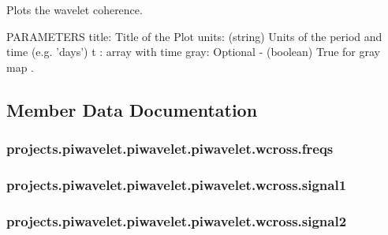 Plots the wavelet coherence. 

P\-A\-R\-A\-M\-E\-T\-E\-R\-S title\-: Title of the Plot units\-: (string) Units of the period and time (e.\-g. 'days') t \-: array with time gray\-: Optional -\/ (boolean) True for gray map . 

\subsection{Member Data Documentation}
\hypertarget{classprojects_1_1piwavelet_1_1piwavelet_1_1piwavelet_1_1wcross_acc328d10acf4d14d4cc310626db363f0}{
\subsubsection[{freqs}]{\setlength{\rightskip}{0pt plus 5cm}projects.\-piwavelet.\-piwavelet.\-piwavelet.\-wcross.\-freqs}}\label{classprojects_1_1piwavelet_1_1piwavelet_1_1piwavelet_1_1wcross_acc328d10acf4d14d4cc310626db363f0}
\hypertarget{classprojects_1_1piwavelet_1_1piwavelet_1_1piwavelet_1_1wcross_ae685fd264b719b76e0a5095cb4b65a98}{
\subsubsection[{signal1}]{\setlength{\rightskip}{0pt plus 5cm}projects.\-piwavelet.\-piwavelet.\-piwavelet.\-wcross.\-signal1}}\label{classprojects_1_1piwavelet_1_1piwavelet_1_1piwavelet_1_1wcross_ae685fd264b719b76e0a5095cb4b65a98}
\hypertarget{classprojects_1_1piwavelet_1_1piwavelet_1_1piwavelet_1_1wcross_ab50c021343313dd3495d5eb98d0bb6ad}{
\subsubsection[{signal2}]{\setlength{\rightskip}{0pt plus 5cm}projects.\-piwavelet.\-piwavelet.\-piwavelet.\-wcross.\-signal2}}\label{classprojects_1_1piwavelet_1_1piwavelet_1_1piwavelet_1_1wcross_ab50c021343313dd3495d5eb98d0bb6ad}
